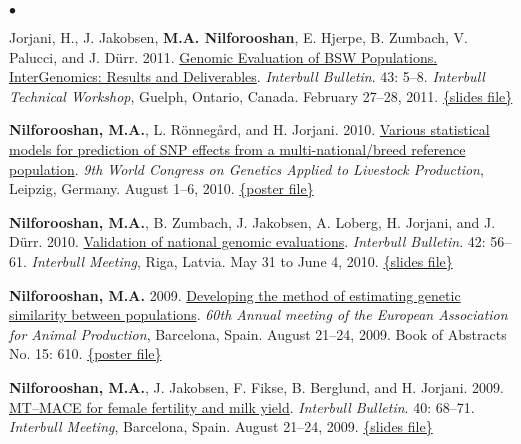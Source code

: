 \documentclass[margin,line]{res}
\newenvironment{list2}{
  \begin{list}{$\bullet$}{%
    \setlength{\itemsep}{0in}
    \setlength{\parsep}{0in} \setlength{\parskip}{0in}
    \setlength{\topsep}{0in} \setlength{\partopsep}{0in}
    \setlength{\leftmargin}{0.2in}}}
  {\end{list}}
\begin{document}
\begin{resume}
\begin{list2}
    \item Jorjani, H., J. Jakobsen, {\bf M.A. Nilforooshan}, E. Hjerpe, B. Zumbach, V. Palucci, and J. D\"{u}rr. 2011. \href{https://www.researchgate.net/publication/265218200_Genomic_Evaluation_of_BSW_Populations_InterGenomics_Results_and_Deliverables}{Genomic Evaluation of BSW Populations. InterGenomics: Results and Deliverables}. {\em Interbull Bulletin}. 43: 5--8. {\em Interbull Technical Workshop}, Guelph, Ontario, Canada. February 27--28, 2011. \href{https://drive.google.com/file/d/0B2l_izQwJmVpbGh3ZC1iRWhCWVE/view?usp=sharing&resourcekey=0-BFevbAqrR4lVT5anezUffQ}{\{slides file\}}
    \item {\bf Nilforooshan, M.A.}, L. R\"{o}nneg\r{a}rd, and H. Jorjani. 2010. \href{https://www.researchgate.net/publication/267973054_Various_Statistical_Models_For_Prediction_Of_SNP_Effects_From_A_Multi-NationalBreed_Reference_Population}{Various statistical models for prediction of SNP effects from a multi-national/breed reference population}. {\em 9th World Congress on Genetics Applied to Livestock Production}, Leipzig, Germany. August 1--6, 2010. \href{https://doi.org/10.13140/RG.2.2.36673.22881}{\{poster file\}}
    \item {\bf Nilforooshan, M.A.}, B. Zumbach, J. Jakobsen, A. Loberg, H. Jorjani, and J. D\"{u}rr. 2010. \href{https://www.researchgate.net/publication/358199921_Validation_of_National_Genomic_Evaluations}{Validation of national genomic evaluations}. {\em Interbull Bulletin}. 42: 56--61. {\em Interbull Meeting}, Riga, Latvia. May 31 to June 4, 2010. \href{https://drive.google.com/file/d/0B2l_izQwJmVpRnlPa0YzS3ZCU1E/view?usp=sharing&resourcekey=0-Tsw-3ZQhJPn8Cm8kG1E6xw}{\{slides file\}}
    \item {\bf Nilforooshan, M.A.} 2009. \href{https://www.researchgate.net/publication/358219264_Developing_the_method_of_estimating_genetic_similarity_between_populations}{Developing the method of estimating genetic similarity between populations}. {\em 60th Annual meeting of the European Association for Animal Production}, Barcelona, Spain. August 21--24, 2009. Book of Abstracts No. 15: 610. \href{https://doi.org/10.13140/RG.2.2.11140.40320}{\{poster file\}}
    \item {\bf Nilforooshan, M.A.}, J. Jakobsen, F. Fikse, B. Berglund, and H. Jorjani. 2009. \href{https://www.researchgate.net/publication/239611615_MT-MACE_for_Female_Fertility_and_Milk_Yield}{MT–MACE for female fertility and milk yield}. {\em Interbull Bulletin}. 40: 68--71. {\em Interbull Meeting}, Barcelona, Spain. August 21--24, 2009. \href{https://drive.google.com/file/d/0B2l_izQwJmVpRTlrOGE3OWluVnc/view?usp=sharing&resourcekey=0-LiA6IgIqSEjLxrAFkXL_Bw}{\{slides file\}}

\end{list2}
\end{resume}
\end{document}
